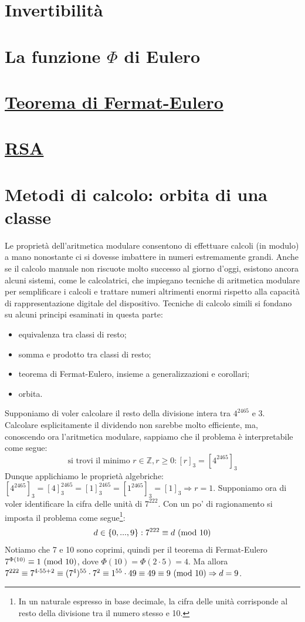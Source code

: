 \documentclass[oneside]{book}
\begin{document}
\section{Invertibilità}
\section{La funzione $\Phi$ di Eulero}
\section{\underline{Teorema di Fermat-Eulero}}
\section{\underline{RSA}}


\section{Metodi di calcolo: orbita di una classe}
Le proprietà dell'aritmetica modulare consentono di effettuare calcoli (in modulo)
a mano nonostante ci si dovesse imbattere in numeri estremamente grandi.
Anche se il calcolo manuale non riscuote molto successo al giorno d'oggi,
esistono ancora alcuni sistemi, come le calcolatrici, che impiegano
tecniche di aritmetica modulare per semplificare i calcoli e trattare
numeri altrimenti enormi rispetto alla capacità di rappresentazione digitale
del dispositivo.
Tecniche di calcolo simili si fondano su alcuni principi esaminati in
questa parte:
\begin{itemize}
\item equivalenza tra classi di resto;
\item somma e prodotto tra classi di resto;
\item teorema di Fermat-Eulero, insieme a generalizzazioni e corollari;
\item orbita.
\end{itemize}
Supponiamo di voler calcolare il resto della divisione intera tra
$4^{2465}$ e $3$. Calcolare esplicitamente il dividendo non sarebbe
molto efficiente, ma, conoscendo ora l'aritmetica modulare, sappiamo
che il problema è interpretabile come segue:
\[ \text{si trovi il minimo } r\in\mathbb{Z},r\geq0: [r]_3 = [4^{2465}]_3 \]
Dunque applichiamo le proprietà algebriche: $[4^{2465}]_3 = [4]^{2465}_3 = [1]_3^{2465} = [1^{2465}]_3 = [1]_3 \Rightarrow r = 1$.
Supponiamo ora di voler identificare la cifra delle unità di $7^{222}$.
Con un po' di ragionamento si imposta il problema come segue\footnote{In un naturale espresso in
base decimale, la cifra delle unità corrisponde al resto della divisione tra il numero stesso e 10.}:
\[ d\in\{0,...,9\}: 7^{222}\equiv d\ (\mathrm{mod}\ 10) \]
Notiamo che 7 e 10 sono coprimi, quindi per il teorema di Fermat-Eulero
$7^{\Phi(10)}\equiv 1 \ (\mathrm{mod}\ 10)$, dove $\Phi(10)=\Phi(2\cdot5)=4$. Ma
allora $7^{222}\equiv 7^{4\cdot55+2} \equiv (7^4)^{55}\cdot7^2\equiv 1^{55}\cdot 49 \equiv 49\equiv 9 \ (\mathrm{mod}\ 10) \Rightarrow d=9$.
\end{document}
